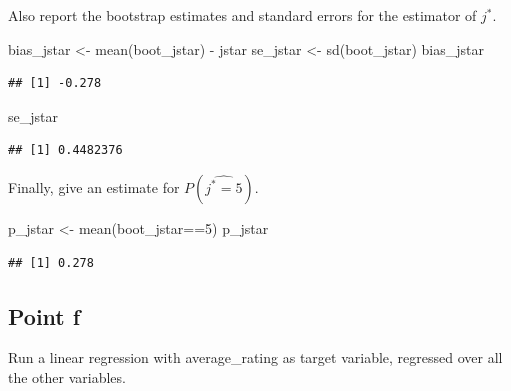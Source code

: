 \documentclass[
]{article}
\newenvironment{Shaded}{\begin{snugshade}}{\end{snugshade}}
\newcommand{\DecValTok}[1]{\textcolor[rgb]{0.00,0.00,0.81}{#1}}
\newcommand{\FunctionTok}[1]{\textcolor[rgb]{0.00,0.00,0.00}{#1}}
\newcommand{\NormalTok}[1]{#1}
\newcommand{\OtherTok}[1]{\textcolor[rgb]{0.56,0.35,0.01}{#1}}
\newcommand{\SpecialCharTok}[1]{\textcolor[rgb]{0.00,0.00,0.00}{#1}}
\begin{document}
Also report the bootstrap estimates and standard errors for the
estimator of \(j^*\).

\begin{Shaded}
\begin{Highlighting}[]
\NormalTok{bias\_jstar }\OtherTok{\textless{}{-}} \FunctionTok{mean}\NormalTok{(boot\_jstar) }\SpecialCharTok{{-}}\NormalTok{ jstar}
\NormalTok{se\_jstar }\OtherTok{\textless{}{-}} \FunctionTok{sd}\NormalTok{(boot\_jstar)}
\NormalTok{bias\_jstar}
\end{Highlighting}
\end{Shaded}

\begin{verbatim}
## [1] -0.278
\end{verbatim}

\begin{Shaded}
\begin{Highlighting}[]
\NormalTok{se\_jstar}
\end{Highlighting}
\end{Shaded}

\begin{verbatim}
## [1] 0.4482376
\end{verbatim}

Finally, give an estimate for \(P(\hat{j^*=5})\).

\begin{Shaded}
\begin{Highlighting}[]
\NormalTok{p\_jstar }\OtherTok{\textless{}{-}} \FunctionTok{mean}\NormalTok{(boot\_jstar}\SpecialCharTok{==}\DecValTok{5}\NormalTok{)}
\NormalTok{p\_jstar}
\end{Highlighting}
\end{Shaded}

\begin{verbatim}
## [1] 0.278
\end{verbatim}

\hypertarget{point-f-1}{%
\subsection{Point f}\label{point-f-1}}

Run a linear regression with average\_rating as target variable,
regressed over all the other variables.
\end{document}
